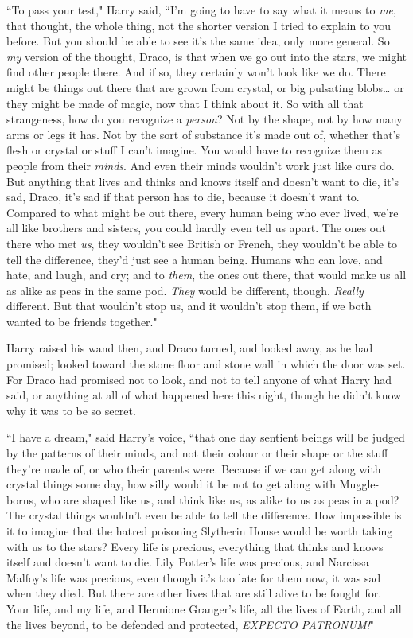 ``To pass your test," Harry said, ``I'm going to have to say what it means to \emph{me}, that thought, the whole thing, not the shorter version I tried to explain to you before. But you should be able to see it's the same idea, only more general. So \emph{my} version of the thought, Draco, is that when we go out into the stars, we might find other people there. And if so, they certainly won't look like we do. There might be things out there that are grown from crystal, or big pulsating blobs{\ldots} or they might be made of magic, now that I think about it. So with all that strangeness, how do you recognize a \emph{person}? Not by the shape, not by how many arms or legs it has. Not by the sort of substance it's made out of, whether that's flesh or crystal or stuff I can't imagine. You would have to recognize them as people from their \emph{minds}. And even their minds wouldn't work just like ours do. But anything that lives and thinks and knows itself and doesn't want to die, it's sad, Draco, it's sad if that person has to die, because it doesn't want to. Compared to what might be out there, every human being who ever lived, we're all like brothers and sisters, you could hardly even tell us apart. The ones out there who met \emph{us}, they wouldn't see British or French, they wouldn't be able to tell the difference, they'd just see a human being. Humans who can love, and hate, and laugh, and cry; and to \emph{them}, the ones out there, that would make us all as alike as peas in the same pod. \emph{They} would be different, though. \emph{Really} different. But that wouldn't stop us, and it wouldn't stop them, if we both wanted to be friends together."

Harry raised his wand then, and Draco turned, and looked away, as he had promised; looked toward the stone floor and stone wall in which the door was set. For Draco had promised not to look, and not to tell anyone of what Harry had said, or anything at all of what happened here this night, though he didn't know why it was to be so secret.

``I have a dream," said Harry's voice, ``that one day sentient beings will be judged by the patterns of their minds, and not their colour or their shape or the stuff they're made of, or who their parents were. Because if we can get along with crystal things some day, how silly would it be not to get along with Muggle-borns, who are shaped like us, and think like us, as alike to us as peas in a pod? The crystal things wouldn't even be able to tell the difference. How impossible is it to imagine that the hatred poisoning Slytherin House would be worth taking with us to the stars? Every life is precious, everything that thinks and knows itself and doesn't want to die. Lily Potter's life was precious, and Narcissa Malfoy's life was precious, even though it's too late for them now, it was sad when they died. But there are other lives that are still alive to be fought for. Your life, and my life, and Hermione Granger's life, all the lives of Earth, and all the lives beyond, to be defended and protected, \emph{EXPECTO PATRONUM!}"

